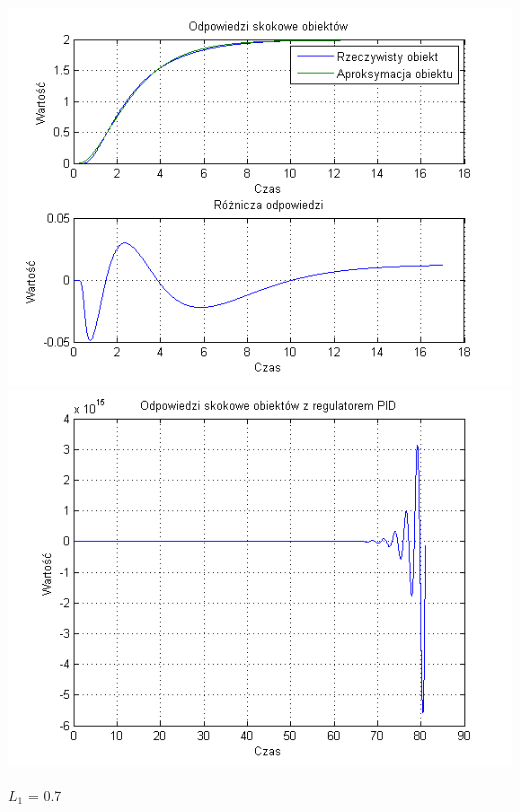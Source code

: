 \documentclass[10pt,a4paper]{article}
\begin{document}
\begin{center}
\includegraphics[scale=1]{images/dwa/skrypt_181.png}\\
\includegraphics[scale=1]{images/dwa/skrypt_182.png}\\
\end{center}
\newpage
$L_1$ = 0.7
\end{document}
